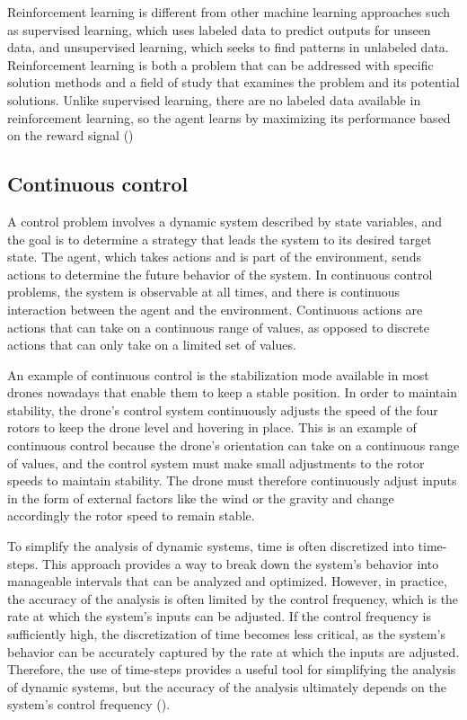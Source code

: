 Reinforcement learning is different from other machine learning approaches such as supervised learning, which uses labeled data to predict outputs for unseen data, and unsupervised learning, which seeks to find patterns in unlabeled data. Reinforcement learning is both a problem that can be addressed with specific solution methods and a field of study that examines the problem and its potential solutions. Unlike supervised learning, there are no labeled data available in reinforcement learning, so the agent learns by maximizing its performance based on the reward signal (\cite{sutton_reinforcement_1998,sutton_reinforcement_2018})

\subsection{Continuous control}
A control problem involves a dynamic system described by state variables, and the goal is to determine a strategy that leads the system to its desired target state. The agent, which takes actions and is part of the environment, sends actions to determine the future behavior of the system. In continuous control problems, the system is observable at all times, and there is continuous interaction between the agent and the environment. Continuous actions are actions that can take on a continuous range of values, as opposed to discrete actions that can only take on a limited set of values.

An example of continuous control is the stabilization mode available in most drones nowadays that enable them to keep a stable position. In order to maintain stability, the drone's control system continuously adjusts the speed of the four rotors to keep the drone level and hovering in place. This is an example of continuous control because the drone's orientation can take on a continuous range of values, and the control system must make small adjustments to the rotor speeds to maintain stability. The drone must therefore continuously adjust inputs in the form of external factors like the wind or the gravity and change accordingly the rotor speed to remain stable.

To simplify the analysis of dynamic systems, time is often discretized into time-steps. This approach provides a way to break down the system's behavior into manageable intervals that can be analyzed and optimized. However, in practice, the accuracy of the analysis is often limited by the control frequency, which is the rate at which the system's inputs can be adjusted. If the control frequency is sufficiently high, the discretization of time becomes less critical, as the system's behavior can be accurately captured by the rate at which the inputs are adjusted. Therefore, the use of time-steps provides a useful tool for simplifying the analysis of dynamic systems, but the accuracy of the analysis ultimately depends on the system's control frequency (\cite{franklin_feedback_2014}).

